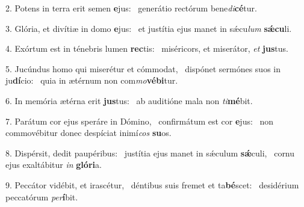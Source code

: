 2. Potens in terra erit semen \textbf{e}jus: \ast\  generátio rectórum bene\textit{di}\textbf{cé}tur.\

3. Glória, et divítiæ in domo \textbf{e}jus: \ast\  et justítia ejus manet in sǽcu\textit{lum} \textbf{sǽ}\textbf{cu}li.\

4. Exórtum est in ténebris lumen \textbf{rec}tis: \ast\  miséricors, et miserátor, \textit{et} \textbf{jus}tus.\

5. Jucúndus homo qui miserétur et cómmodat, \dag\  dispónet sermónes suos in ju\textbf{dí}cio: \ast\  quia in ætérnum non com\textit{mo}\textbf{vé}\textbf{bi}tur.\

6. In memória ætérna erit \textbf{jus}tus: \ast\  ab auditióne mala non \textit{ti}\textbf{mé}bit.\

7. Parátum cor ejus speráre in Dómino, \dag\  confirmátum est cor \textbf{e}jus: \ast\  non commovébitur donec despíciat inimí\textit{cos} \textbf{su}os.\

8. Dispérsit, dedit paupéribus: \dag\  justítia ejus manet in sǽculum \textbf{sǽ}culi, \ast\  cornu ejus exaltábitur \textit{in} \textbf{gló}\textbf{ri}a.\

9. Peccátor vidébit, et irascétur, \dag\  déntibus suis fremet et ta\textbf{bé}scet: \ast\  desidérium peccatórum \textit{per}\textbf{í}bit.\

